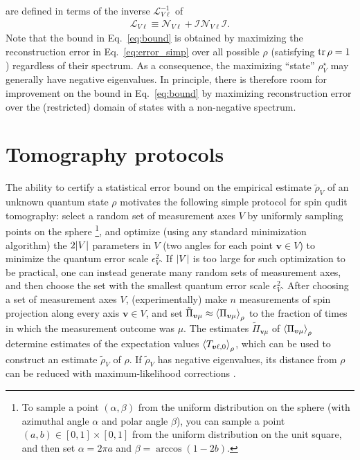 \documentclass[notitlepage,twocolumn]{revtex4-2}
\newcommand{\p}[1]{\left(#1\right)} %
\newcommand{\bk}{\Braket} %
\renewcommand{\v}{\bm} %
\newcommand{\I}{\mathcal{I}}
\renewcommand{\L}{\mathcal{L}}
\newcommand{\N}{\mathcal{N}}
\newcommand{\1}{\mathds{1}}
\begin{document}
are defined in terms of the inverse $\L_{V\ell}^{-1}$ of
\begin{align}
  \L_{V\ell} \equiv \N_{V\ell} + \I \N_{V\ell} \I.
\end{align}
Note that the bound in Eq.~\eqref{eq:bound} is obtained by maximizing the reconstruction error in Eq.~\eqref{eq:error_simp} over all possible $\rho$ (satisfying $\tr\rho=1$) regardless of their spectrum.
As a consequence, the maximizing ``state'' $\rho_V^\star$ may generally have negative eigenvalues.
In principle, there is therefore room for improvement on the bound in Eq.~\eqref{eq:bound} by maximizing reconstruction error over the (restricted) domain of states with a non-negative spectrum.

\section{Tomography protocols}
\label{sec:protocol}

The ability to certify a statistical error bound on the empirical estimate $\tilde\rho_V$ of an unknown quantum state $\rho$ motivates the following simple protocol for spin qudit tomography: select a random set of measurement axes $V$ by uniformly sampling points on the sphere \footnote{To sample a point $\p{\alpha,\beta}$ from the uniform distribution on the sphere (with azimuthal angle $\alpha$ and polar angle $\beta$), you can sample a point $\p{a,b}\in[0,1]\times[0,1]$ from the uniform distribution on the unit square, and then set $\alpha=2\pi a$ and $\beta=\arccos\p{1-2b}$.}, and optimize (using any standard minimization algorithm) the $2\abs{V}$ parameters in $V$ (two angles for each point $\v v\in V$) to minimize the quantum error scale $\epsilon_V^2$.
If $\abs{V}$ is too large for such optimization  to be practical, one can instead generate many random sets of measurement axes, and then choose the set with the smallest quantum error scale $\epsilon_V^2$.
After choosing a set of measurement axes $V$, (experimentally) make $n$ measurements of spin projection along every axis $\v v\in V$, and set $\tilde\Pi_{\v v\mu}\approx\bk{\Pi_{\v v\mu}}_\rho$ to the fraction of times in which the measurement outcome was $\mu$.
The estimates $\tilde\Pi_{\v v\mu}$ of $\bk{\Pi_{\v v\mu}}_\rho$ determine estimates of the expectation values $\bk{T_{\v v\ell,0}}_\rho$, which can be used to construct an estimate $\tilde\rho_V$ of $\rho$.
If $\tilde\rho_V$ has negative eigenvalues, its distance from $\rho$ can be reduced with maximum-likelihood corrections \cite{smolin2012efficient}.
\end{document}
